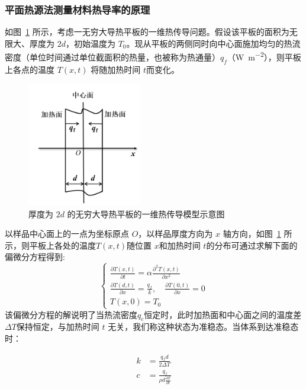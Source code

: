 \documentclass[a4paper,utf8]{article}
\newcommand{\fgref}[1]{图~\ref{#1} }
\begin{document}
        \subsubsection{平面热源法测量材料热导率的原理}
            如\fgref{fg:2}所示，考虑一无穷大导热平板的一维热传导问题。假设该平板的面积为无限大、厚度为 $2d$，初始温度为 $T_0$。现从平板的两侧同时向中心面施加均匀的热流密度（单位时间通过单位截面积的热量，也被称为热通量）$q_f$（\unit{\watt\per\meter\squared}），则平板上各点的温度 $T(x,t)$ 将随加热时间 $t$而变化。
            \begin{figure}[!ht]\centering
                \includegraphics[width=50mm]{fg2.png}
                \caption{厚度为 $2d$ 的无穷大导热平板的一维热传导模型示意图 \label{fg:2}}
            \end{figure}\par
            以样品中心面上的一点为坐标原点 $O$，以样品厚度方向为 $x$ 轴方向，如\fgref{fg:2} 所示，则平板上各处的温度$T(x,t)$随位置 $x$和加热时间 $t$的分布可通过求解下面的偏微分方程得到:
            \begin{equation}
                \begin{cases}
                    \frac{\partial T(x,t)}{\partial t}=\alpha\frac{\partial^2T(x,t)}{\partial x^2}\\
                    \frac{\partial T(d,t)}{\partial x}=\frac{q_f}k ,\quad\frac{\partial T(0,t)}{\partial x}=0\\
                    T(x,0)=T_0
                \end{cases}
            \end{equation}
            该偏微分方程的解说明了当热流密度$q_c$恒定时，此时加热面和中心面之间的温度差$\varDelta T$保持恒定，与加热时间 $t$ 无关，我们称这种状态为准稳态。当体系到达准稳态时：\par
            \begin{equation}
                \begin{aligned}
                    k&=\frac{q_fd}{2\Delta T}\\
                    c&=\frac{q_f}{\rho d\frac{\partial T}{\partial t}}
                \end{aligned}
            \end{equation}
\end{document}
